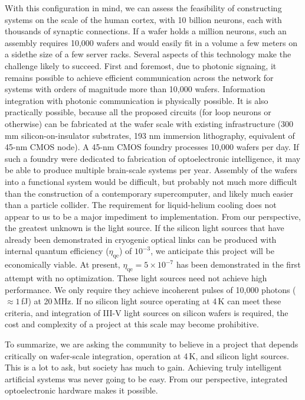 \documentclass[twocolumn]{article}
\begin{document}
With this configuration in mind, we can assess the feasibility of constructing systems on the scale of the human cortex, with 10 billion neurons, each with thousands of synaptic connections. If a wafer holds a million neurons, such an assembly requires 10,000 wafers and would easily fit in a volume a few meters on a side\textemdash the size of a few server racks. Several aspects of this technology make the challenge likely to succeed. First and foremost, due to photonic signaing, it remains possible to achieve efficient communication across the network for systems with orders of magnitude more than 10,000 wafers. Information integration with photonic communication is physically possible. It is also practically possible, because all the proposed circuits (for loop neurons or otherwise) can be fabricated at the wafer scale with existing infrastructure (300 mm silicon-on-insulator substrates, 193 nm immersion lithography, equivalent of 45-nm CMOS node). A 45-nm CMOS foundry processes 10,000 wafers per day. If such a foundry were dedicated to fabrication of optoelectronic intelligence, it may be able to produce multiple brain-scale systems per year. Assembly of the wafers into a functional system would be difficult, but probably not much more difficult than the construction of a contemporary supercomputer, and likely much easier than a particle collider. The requirement for liquid-helium cooling does not appear to us to be a major impediment to implementation. From our perspective, the greatest unknown is the light source. If the silicon light sources that have already been demonstrated in cryogenic optical links \cite{buch2017} can be produced with internal quantum efficiency ($\eta_{\mathrm{qe}}$) of $10^{-3}$, we anticipate this project will be economically viable. At present, $\eta_{\mathrm{qe}} = 5\times10^{-7}$ has been demonstrated in the first attempt with no optimization. These light sources need not achieve high performance. We only require they achieve incoherent pulses of 10,000 photons ($\approx 1$\,fJ) at 20\,MHz. If no silicon light source operating at 4\,K can meet these criteria, and integration of III-V light sources on silicon wafers is required, the cost and complexity of a project at this scale may become prohibitive.

To summarize, we are asking the community to believe in a project that depends critically on wafer-scale integration, operation at 4\,K, and silicon light sources. This is a lot to ask, but society has much to gain. Achieving truly intelligent artificial systems was never going to be easy. From our perspective, integrated optoelectronic hardware makes it possible. 
\end{document}
